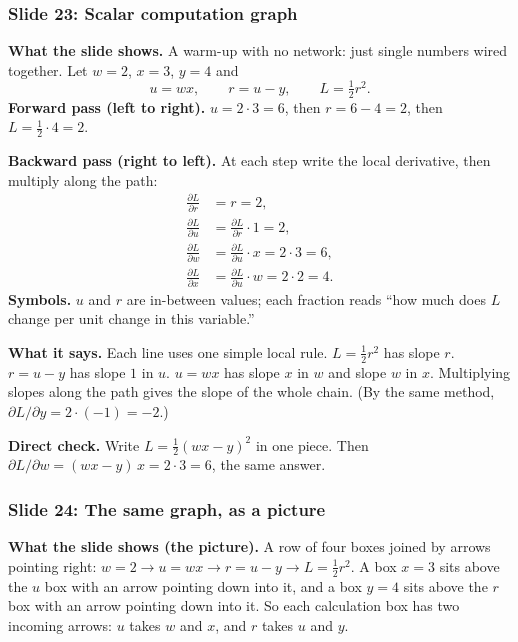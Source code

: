 \subsubsection{Slide 23: Scalar computation graph}

\textbf{What the slide shows.} A warm-up with no network: just single numbers wired together. Let $w=2$, $x=3$, $y=4$ and
\[
u=wx, \qquad r=u-y, \qquad L=\tfrac12r^2.
\]
\textbf{Forward pass (left to right).} $u=2\cdot3=6$, then $r=6-4=2$, then $L=\tfrac12\cdot4=2$.

\textbf{Backward pass (right to left).} At each step write the local derivative, then multiply along the path:
\[
\begin{aligned}
\frac{\partial L}{\partial r} &= r = 2, \\
\frac{\partial L}{\partial u} &= \frac{\partial L}{\partial r}\cdot1 = 2, \\
\frac{\partial L}{\partial w} &= \frac{\partial L}{\partial u}\cdot x = 2\cdot3=6, \\
\frac{\partial L}{\partial x} &= \frac{\partial L}{\partial u}\cdot w = 2\cdot2=4 .
\end{aligned}
\]
\textbf{Symbols.} $u$ and $r$ are in-between values; each fraction reads ``how much does $L$ change per unit change in this variable.''

\textbf{What it says.} Each line uses one simple local rule. $L=\tfrac12r^2$ has slope $r$. $r=u-y$ has slope $1$ in $u$. $u=wx$ has slope $x$ in $w$ and slope $w$ in $x$. Multiplying slopes along the path gives the slope of the whole chain. (By the same method, $\partial L/\partial y = 2\cdot(-1) = -2$.)

\textbf{Direct check.} Write $L=\tfrac12(wx-y)^2$ in one piece. Then $\partial L/\partial w=(wx-y)\,x=2\cdot3=6$, the same answer.

\subsubsection{Slide 24: The same graph, as a picture}

\textbf{What the slide shows (the picture).} A row of four boxes joined by arrows pointing right: $w=2\to u=wx\to r=u-y\to L=\tfrac12r^2$. A box $x=3$ sits above the $u$ box with an arrow pointing down into it, and a box $y=4$ sits above the $r$ box with an arrow pointing down into it. So each calculation box has two incoming arrows: $u$ takes $w$ and $x$, and $r$ takes $u$ and $y$.

